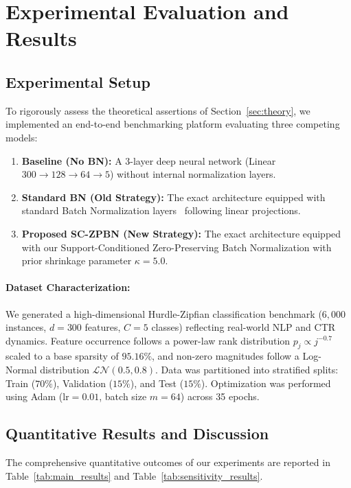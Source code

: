 \documentclass[twocolumn,10pt]{article}
\begin{document}
\section{Experimental Evaluation and Results}
\label{sec:experiments}

\subsection{Experimental Setup}
To rigorously assess the theoretical assertions of Section~\ref{sec:theory}, we implemented an end-to-end benchmarking platform evaluating three competing models:
\begin{enumerate}
    \item \textbf{Baseline (No BN):} A 3-layer deep neural network (Linear $300 \to 128 \to 64 \to 5$) without internal normalization layers.
    \item \textbf{Standard BN (Old Strategy):} The exact architecture equipped with standard Batch Normalization layers~\cite{ioffe2015batch} following linear projections.
    \item \textbf{Proposed SC-ZPBN (New Strategy):} The exact architecture equipped with our Support-Conditioned Zero-Preserving Batch Normalization with prior shrinkage parameter $\kappa = 5.0$.
\end{enumerate}

\paragraph{Dataset Characterization:}
We generated a high-dimensional Hurdle-Zipfian classification benchmark ($6,000$ instances, $d=300$ features, $C=5$ classes) reflecting real-world NLP and CTR dynamics. Feature occurrence follows a power-law rank distribution $p_j \propto j^{-0.7}$ scaled to a base sparsity of $95.16\%$, and non-zero magnitudes follow a Log-Normal distribution $\mathcal{LN}(0.5, 0.8)$. Data was partitioned into stratified splits: Train ($70\%$), Validation ($15\%$), and Test ($15\%$). Optimization was performed using Adam ($\mathrm{lr}=0.01$, batch size $m=64$) across 35 epochs.

\subsection{Quantitative Results and Discussion}

The comprehensive quantitative outcomes of our experiments are reported in Table~\ref{tab:main_results} and Table~\ref{tab:sensitivity_results}.
\end{document}
